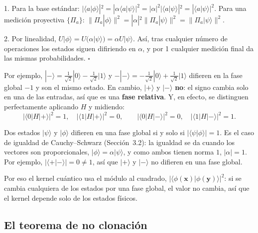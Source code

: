 \documentclass[11pt, a4paper, twoside, openright]{report}
\begin{document}
\begin{tcolorbox}[colback=gray!5!white,colframe=gray!75!black,title=\textbf{Demostración}]
1. Para la base estándar: $|\langle a|\phi\rangle|^2 = |\alpha\langle a|\psi\rangle|^2 = |\alpha|^2|\langle a|\psi\rangle|^2 = |\langle a|\psi\rangle|^2$. Para una medición proyectiva $\{\Pi_a\}$: $\|\Pi_a|\phi\rangle\|^2 = |\alpha|^2\|\Pi_a|\psi\rangle\|^2 = \|\Pi_a|\psi\rangle\|^2$.

2. Por linealidad, $U|\phi\rangle = U(\alpha|\psi\rangle) = \alpha U|\psi\rangle$. Así, tras cualquier número de operaciones los estados siguen difiriendo en $\alpha$, y por 1 cualquier medición final da las mismas probabilidades. \hfill $\square$
\end{tcolorbox}

\noindent Por ejemplo, $|-\rangle = \frac{1}{\sqrt2}|0\rangle - \frac{1}{\sqrt2}|1\rangle$ y $-|-\rangle = -\frac{1}{\sqrt2}|0\rangle + \frac{1}{\sqrt2}|1\rangle$ difieren en la fase global $-1$ y son el mismo estado. En cambio, $|+\rangle$ y $|-\rangle$ \textbf{no}: el signo cambia solo en una de las entradas, así que es una \textbf{fase relativa}. Y, en efecto, se distinguen perfectamente aplicando $H$ y midiendo:
\[ |\langle0|H|+\rangle|^2 = 1, \quad |\langle1|H|+\rangle|^2 = 0, \qquad |\langle0|H|-\rangle|^2 = 0, \quad |\langle1|H|-\rangle|^2 = 1. \]

\begin{tcolorbox}[colback=blue!5!white,colframe=blue!75!black,title=\textbf{Nota Aclaratoria: Cómo reconocer una fase global}]
Dos estados $|\psi\rangle$ y $|\phi\rangle$ difieren en una fase global si y solo si $|\langle\psi|\phi\rangle| = 1$. Es el caso de igualdad de Cauchy--Schwarz (Sección~3.2): la igualdad se da cuando los vectores son proporcionales, $|\phi\rangle = \alpha|\psi\rangle$, y como ambos tienen norma $1$, $|\alpha| = 1$. Por ejemplo, $|\langle+|-\rangle| = 0\neq1$, así que $|+\rangle$ y $|-\rangle$ no difieren en una fase global.

Por eso el kernel cuántico usa el módulo al cuadrado, $|\langle\phi(\mathbf{x})|\phi(\mathbf{y})\rangle|^2$: si se cambia cualquiera de los estados por una fase global, el valor no cambia, así que el kernel depende solo de los estados físicos.
\end{tcolorbox}

\subsection{El teorema de no clonación}
\end{document}
